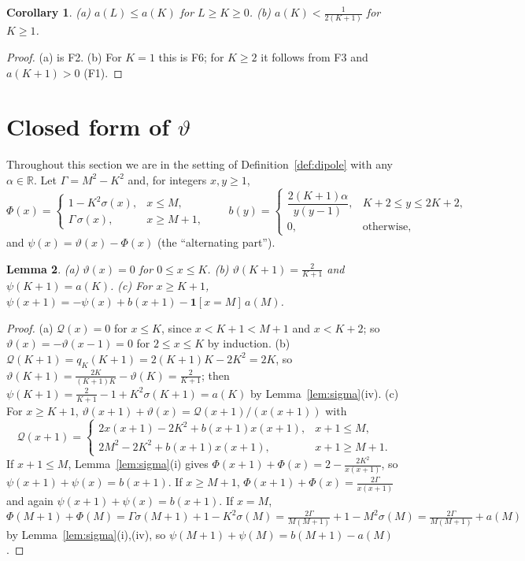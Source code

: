 \documentclass[11pt]{amsart}
\newtheorem{lemma}{Lemma}[section]
\newtheorem{corollary}[lemma]{Corollary}
\theoremstyle{definition}
\theoremstyle{remark}
\numberwithin{equation}{section}
\newcommand{\R}{\mathbb{R}}
\newcommand{\ind}[1]{\mathbf{1}[#1]}
\newcommand{\cQ}{\mathcal{Q}}
\begin{document}
\begin{corollary}\label{cor:facts}
\textup{(a)} $a(L)\le a(K)$ for $L\ge K\ge0$. \textup{(b)} $a(K)<\frac1{2(K+1)}$ for $K\ge1$.
\end{corollary}

\begin{proof}
(a) is F2. (b) For $K=1$ this is F6; for $K\ge2$ it follows from F3 and $a(K+1)>0$ (F1).
\end{proof}

\section{Closed form of \texorpdfstring{$\vartheta$}{theta}}\label{sec:closed}

Throughout this section we are in the setting of Definition~\ref{def:dipole} with any $\alpha\in\R$.
Let $\Gamma=M^2-K^2$ and, for integers $x,y\ge1$,
\[
  \Phi(x)=\begin{cases}1-K^2\sigma(x), & x\le M,\\ \Gamma\,\sigma(x), & x\ge M+1,\end{cases}\qquad
  b(y)=\begin{cases}\dfrac{2(K+1)\alpha}{y(y-1)}, & K+2\le y\le2K+2,\\[4pt] 0, & \text{otherwise},\end{cases}
\]
and $\psi(x)=\vartheta(x)-\Phi(x)$ (the ``alternating part'').

\begin{lemma}\label{lem:closed}
\textup{(a)} $\vartheta(x)=0$ for $0\le x\le K$.
\textup{(b)} $\vartheta(K+1)=\frac2{K+1}$ and $\psi(K+1)=a(K)$.
\textup{(c)} For $x\ge K+1$, $\psi(x+1)=-\psi(x)+b(x+1)-\ind{x=M}\,a(M)$.
\end{lemma}

\begin{proof}
(a) $\cQ(x)=0$ for $x\le K$, since $x<K+1<M+1$ and $x<K+2$; so $\vartheta(x)=-\vartheta(x-1)=0$ for
$2\le x\le K$ by induction. (b)
$\cQ(K+1)=q_K(K+1)=2(K+1)K-2K^2=2K$, so $\vartheta(K+1)=\frac{2K}{(K+1)K}-\vartheta(K)=\frac2{K+1}$; then
$\psi(K+1)=\frac2{K+1}-1+K^2\sigma(K+1)=a(K)$ by Lemma~\ref{lem:sigma}(iv). (c) For $x\ge K+1$,
$\vartheta(x+1)+\vartheta(x)=\cQ(x+1)/(x(x+1))$ with
\[
  \cQ(x+1)=\begin{cases}2x(x+1)-2K^2+b(x+1)x(x+1), & x+1\le M,\\ 2M^2-2K^2+b(x+1)x(x+1), & x+1\ge M+1.\end{cases}
\]
If $x+1\le M$, Lemma~\ref{lem:sigma}(i) gives $\Phi(x+1)+\Phi(x)=2-\frac{2K^2}{x(x+1)}$, so
$\psi(x+1)+\psi(x)=b(x+1)$. If $x\ge M+1$, $\Phi(x+1)+\Phi(x)=\frac{2\Gamma}{x(x+1)}$ and again
$\psi(x+1)+\psi(x)=b(x+1)$. If $x=M$,
$\Phi(M+1)+\Phi(M)=\Gamma\sigma(M+1)+1-K^2\sigma(M)=\frac{2\Gamma}{M(M+1)}+1-M^2\sigma(M)
=\frac{2\Gamma}{M(M+1)}+a(M)$ by Lemma~\ref{lem:sigma}(i),(iv), so $\psi(M+1)+\psi(M)=b(M+1)-a(M)$.
\end{proof}
\end{document}
